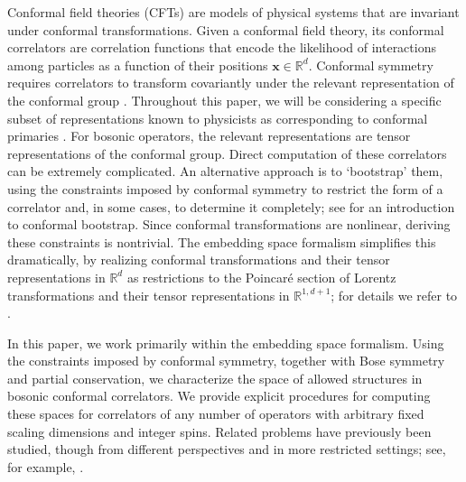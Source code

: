 \documentclass[12pt,a4paper]{extarticle}
\theoremstyle{definition}
\begin{document}
Conformal field theories (CFTs) are models of physical systems that are invariant under conformal transformations. Given a conformal field theory, its conformal correlators are correlation functions that encode the likelihood of interactions among particles as a function of their positions $\mathbf{x}\in\mathbb{R}^d$. 
Conformal symmetry requires correlators to transform covariantly under the relevant representation of the conformal group \cite[§III.C]{PRV}. Throughout this paper, we will be considering a specific subset of representations known to physicists as corresponding to conformal primaries \cite[§III.B]{PRV}. For bosonic operators, the relevant representations are tensor representations of the conformal group. Direct computation of these correlators can be extremely complicated. An alternative approach is to `bootstrap' them, using the constraints imposed by conformal symmetry to restrict the form of a correlator and, in some cases, to determine it completely; see \cite{SimmonsDuffin} for an introduction to  conformal bootstrap. Since conformal transformations are nonlinear, deriving these constraints is nontrivial. 
The embedding space formalism simplifies this dramatically, by realizing conformal transformations and their tensor representations in $\mathbb{R}^d$ as restrictions to the Poincar\'e section of Lorentz transformations and their tensor representations in $\mathbb{R}^{1,d+1}$; for details we refer to \cite{CPPR,Dirac,FGG2,FGG,MackSalam,Weinberg}.

\medskip

In this paper, we work  primarily within the embedding space formalism. Using the constraints imposed by conformal symmetry, together with Bose symmetry and partial conservation, we characterize the space of allowed structures in bosonic conformal correlators. 
We provide explicit procedures for computing these spaces for correlators of any number of ope\-rators with arbitrary fixed scaling dimensions and integer spins. Related problems have previously been studied, though from different perspectives and in more restricted settings; see, for example, \cite{DanielNathan,CT,CPPR,DKKPS, GHL, HLMM, KSD,Zhiboedov}.
\end{document}
